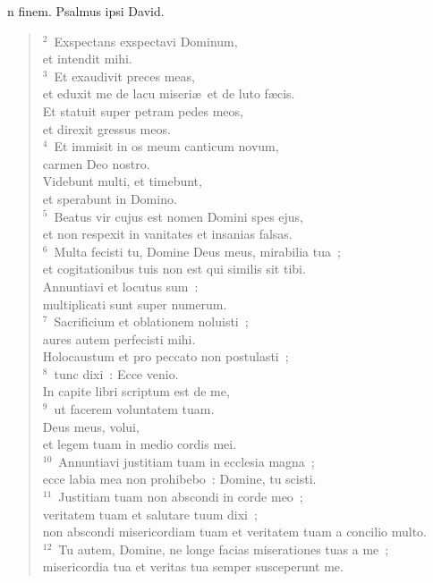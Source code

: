 \bchapter
{}n finem. Psalmus ipsi David.
\begin{flushleft}\begin{verse}\vspace{6pt}${}^{2}$~Exspectans exspectavi Dominum,\\ et intendit mihi.\\
${}^{3}$~Et exaudivit preces meas,\\ et eduxit me de lacu miseri\ae\ et de luto f\ae cis.\\ Et statuit super petram pedes meos,\\ et direxit gressus meos.\\
${}^{4}$~Et immisit in os meum canticum novum,\\ carmen Deo nostro.\\ Videbunt multi, et timebunt,\\ et sperabunt in Domino.\\
${}^{5}$~Beatus vir cujus est nomen Domini spes ejus,\\ et non respexit in vanitates et insanias falsas.\\
${}^{6}$~Multa fecisti tu, Domine Deus meus, mirabilia tua~;\\ et cogitationibus tuis non est qui similis sit tibi.\\ Annuntiavi et locutus sum~:\\ multiplicati sunt super numerum.\\
${}^{7}$~Sacrificium et oblationem noluisti~;\\ aures autem perfecisti mihi.\\ Holocaustum et pro peccato non postulasti~;\\
${}^{8}$~tunc dixi~: Ecce venio.\\ In capite libri scriptum est de me,\\
${}^{9}$~ut facerem voluntatem tuam.\\ Deus meus, volui,\\ et legem tuam in medio cordis mei.\\
${}^{10}$~Annuntiavi justitiam tuam in ecclesia magna~;\\ ecce labia mea non prohibebo~: Domine, tu scisti.\\
${}^{11}$~Justitiam tuam non abscondi in corde meo~;\\ veritatem tuam et salutare tuum dixi~;\\ non abscondi misericordiam tuam et veritatem tuam a concilio multo.\\
${}^{12}$~Tu autem, Domine, ne longe facias miserationes tuas a me~;\\ misericordia tua et veritas tua semper susceperunt me.\\

\end{verse}
\end{flushleft}
